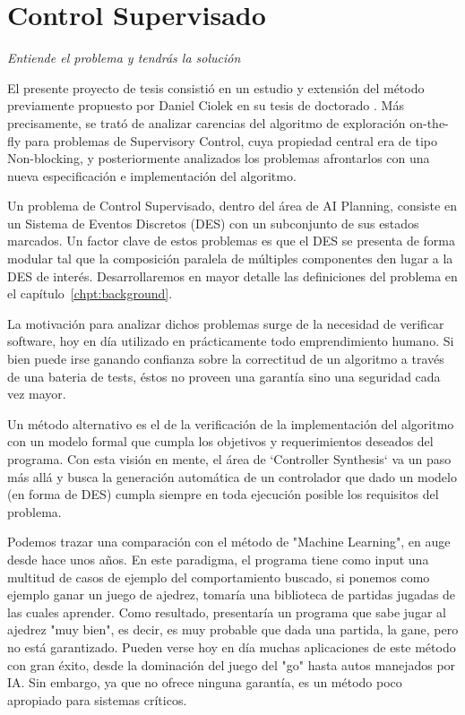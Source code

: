 \section{Control Supervisado}
{\begin{small}%
\begin{flushright}%
\it
Entiende el problema y tendrás la solución
\end{flushright}%
\end{small}%
\vspace{.5cm}}
El presente proyecto de tesis consistió en un estudio y extensión del método previamente propuesto por Daniel Ciolek en su tesis de doctorado \cite{tesisDani}. Más precisamente, se trató de analizar carencias del algoritmo de exploración on-the-fly para problemas de Supervisory Control, cuya propiedad central era de tipo Non-blocking, y posteriormente analizados los problemas afrontarlos con una nueva especificación e implementación del algoritmo.

Un problema de Control Supervisado, dentro del área de AI Planning, consiste en un Sistema de Eventos Discretos (DES) con un subconjunto de sus estados marcados. Un factor clave de estos problemas es que el DES se presenta de forma modular tal que la composición paralela de múltiples componentes den lugar a la DES de interés. Desarrollaremos en mayor detalle las definiciones del problema en el capítulo~\ref{chpt:background}.

La motivación para analizar dichos problemas surge de la necesidad de verificar software, hoy en día utilizado en prácticamente todo emprendimiento humano. Si bien puede irse ganando confianza sobre la correctitud de un algoritmo a través de una bateria de tests, éstos no proveen una garantía sino una seguridad cada vez mayor. 

Un método alternativo es el de la verificación de la implementación del algoritmo con un modelo formal que cumpla los objetivos y requerimientos deseados del programa. Con esta visión en mente, el área de `Controller Synthesis` va un paso más allá y busca la generación automática de un controlador que dado un modelo (en forma de DES) cumpla siempre en toda ejecución posible los requisitos del problema.

Podemos trazar una comparación con el método de "Machine Learning", en auge desde hace unos años. En este paradigma, el programa tiene como input una multitud de casos de ejemplo del comportamiento buscado, si ponemos como ejemplo ganar un juego de ajedrez, tomaría una biblioteca de partidas jugadas de las cuales aprender. Como resultado, presentaría un programa que sabe jugar al ajedrez "muy bien", es decir, es muy probable que dada una partida, la gane, pero no está garantizado. Pueden verse hoy en día muchas aplicaciones de este método con gran éxito, desde la dominación del juego del "go" hasta autos manejados por IA. Sin embargo, ya que no ofrece ninguna garantía, es un método poco apropiado para sistemas críticos.

